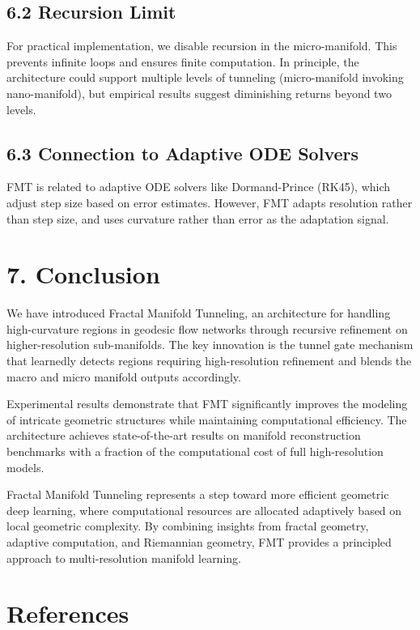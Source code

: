 \documentclass[12pt]{article}
\begin{document}
\subsection{6.2 Recursion Limit}

For practical implementation, we disable recursion in the micro-manifold. This prevents infinite loops and ensures finite computation. In principle, the architecture could support multiple levels of tunneling (micro-manifold invoking nano-manifold), but empirical results suggest diminishing returns beyond two levels.

\subsection{6.3 Connection to Adaptive ODE Solvers}

FMT is related to adaptive ODE solvers like Dormand-Prince (RK45), which adjust step size based on error estimates. However, FMT adapts resolution rather than step size, and uses curvature rather than error as the adaptation signal.

\section{7. Conclusion}

We have introduced Fractal Manifold Tunneling, an architecture for handling high-curvature regions in geodesic flow networks through recursive refinement on higher-resolution sub-manifolds. The key innovation is the tunnel gate mechanism that learnedly detects regions requiring high-resolution refinement and blends the macro and micro manifold outputs accordingly.

Experimental results demonstrate that FMT significantly improves the modeling of intricate geometric structures while maintaining computational efficiency. The architecture achieves state-of-the-art results on manifold reconstruction benchmarks with a fraction of the computational cost of full high-resolution models.

Fractal Manifold Tunneling represents a step toward more efficient geometric deep learning, where computational resources are allocated adaptively based on local geometric complexity. By combining insights from fractal geometry, adaptive computation, and Riemannian geometry, FMT provides a principled approach to multi-resolution manifold learning.

\section*{References}
\end{document}
